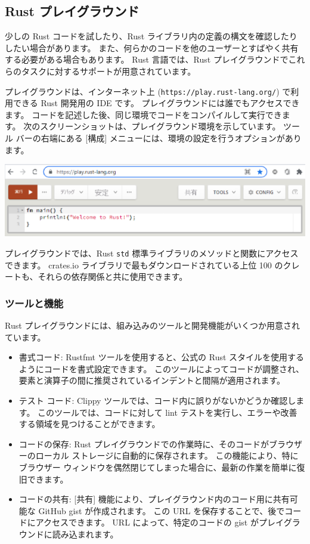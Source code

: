 \subsection{Rust プレイグラウンド}

少しの Rust コードを試したり、Rust ライブラリ内の定義の構文を確認したりしたい場合があります。 また、何らかのコードを他のユーザーとすばやく共有する必要がある場合もあります。 Rust 言語では、Rust プレイグラウンドでこれらのタスクに対するサポートが用意されています。

プレイグラウンドは、インターネット上 (\texttt{https://play.rust-lang.org/}) で利用できる Rust 開発用の IDE です。 プレイグラウンドには誰でもアクセスできます。 コードを記述した後、同じ環境でコードをコンパイルして実行できます。 次のスクリーンショットは、プレイグラウンド環境を示しています。 ツール バーの右端にある [構成] メニューには、環境の設定を行うオプションがあります。

\includegraphics[width=14cm]{rust-playground-main.eps}

プレイグラウンドでは、Rust \texttt{std} 標準ライブラリのメソッドと関数にアクセスできます。 crates.io ライブラリで最もダウンロードされている上位 100 のクレートも、それらの依存関係と共に使用できます。

\subsubsection{ツールと機能}

Rust プレイグラウンドには、組み込みのツールと開発機能がいくつか用意されています。

\begin{itemize}
\item 書式コード: Rustfmt ツールを使用すると、公式の Rust スタイルを使用するようにコードを書式設定できます。 このツールによってコードが調整され、要素と演算子の間に推奨されているインデントと間隔が適用されます。
\item テスト コード: Clippy ツールでは、コード内に誤りがないかどうか確認します。 このツールでは、コードに対して lint テストを実行し、エラーや改善する領域を見つけることができます。
\item コードの保存: Rust プレイグラウンドでの作業時に、そのコードがブラウザーのローカル ストレージに自動的に保存されます。 この機能により、特にブラウザー ウィンドウを偶然閉じてしまった場合に、最新の作業を簡単に復旧できます。
\item コードの共有: [共有] 機能により、プレイグラウンド内のコード用に共有可能な GitHub gist が作成されます。 この URL を保存することで、後でコードにアクセスできます。 URL によって、特定のコードの gist がプレイグラウンドに読み込まれます。
\end{itemize}


